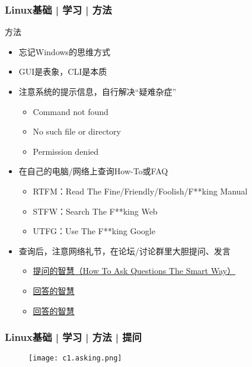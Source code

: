 \begin{frame}
  \frametitle{Linux基础 | 学习 | 方法}
  \begin{block}{方法}
    \begin{itemize}[<+->]
      \item 忘记Windows的思维方式
      \item GUI是表象，CLI是本质
      \item 注意系统的提示信息，自行解决“疑难杂症”
      \begin{itemize}
        \item Command not found
        \item No such file or directory
        \item Permission denied
      \end{itemize}
      \item 在自己的电脑/网络上查询How-To或FAQ
      \begin{itemize}
        \item RTFM：Read The Fine/Friendly/Foolish/F**king Manual
        \item STFW：Search The F**king Web
        \item UTFG：Use The F**king Google
      \end{itemize}
      \item 查询后，注意网络礼节，在论坛/讨论群里大胆提问、发言
      \begin{itemize}
        \item \href{https://github.com/ryanhanwu/How-To-Ask-Questions-The-Smart-Way/blob/master/README-zh_CN.md}{提问的智慧（How To Ask Questions The Smart Way）}
        \item \href{http://dbanotes.net/tech-memo/how_to_answer_questions_the_smart_way.html}{回答的智慧}
        \item \href{https://blog.m157q.tw/posts/2017/12/21/how-to-answer-questions-in-a-helpful-way-zh-tw/}{回答的智慧}
      \end{itemize}
    \end{itemize}
  \end{block}
\end{frame}

\begin{frame}
  \frametitle{Linux基础 | 学习 | 方法 | 提问}
  \begin{figure}
    \centering
    \texttt{[image: c1.asking.png]}
  \end{figure}
\end{frame}

